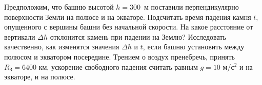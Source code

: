 
Предположим, что башню высотой $h=300$~м поставили перпендикулярно поверхности Земли на полюсе и на экваторе. 
Подсчитать время падения камня $t$, опущенного с вершины башни без начальной скорости. На какое расстояние от 
вертикали $\Delta h$ отклонится камень при падении на Землю? Исследовать качественно, как изменятся значения  $\Delta h$ и  
$t$, если башню установить между полюсом и экватором посередине. Трением о воздух пренебречь, принять $R_\text{З} = 6400$ км, 
ускорение свободного падения считать равным $g=10$ м/с$^2$ и на экваторе, и на полюсе.